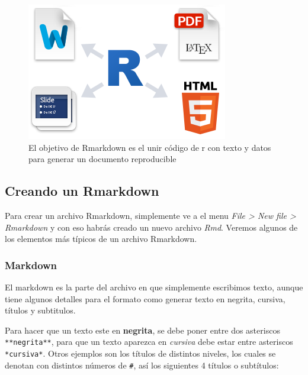 \documentclass[]{book}
\begin{document}
\begin{figure}

{\centering \includegraphics[width=0.8\linewidth]{Rmark} 

}

\caption{El objetivo de Rmarkdown es el unir código de r con texto y datos para generar un documento reproducible}\label{fig:Rmark}
\end{figure}

\hypertarget{creando-un-rmarkdown}{%
\subsection{Creando un Rmarkdown}\label{creando-un-rmarkdown}}

Para crear un archivo Rmarkdown, simplemente ve a el menu \emph{File
\textgreater{} New file \textgreater{} Rmarkdown} y con eso habrás
creado un nuevo archivo \emph{Rmd}. Veremos algunos de los elementos más
típicos de un archivo Rmarkdown.

\hypertarget{markdown}{%
\subsubsection{Markdown}\label{markdown}}

El markdown es la parte del archivo en que simplemente escribimos texto,
aunque tiene algunos detalles para el formato como generar texto en
negrita, cursiva, títulos y subtitulos.

Para hacer que un texto este en \textbf{negrita}, se debe poner entre
dos asteriscos \texttt{**negrita**}, para que un texto aparezca en
\emph{cursiva} debe estar entre asteriscos \texttt{*cursiva*}. Otros
ejemplos son los títulos de distintos niveles, los cuales se denotan con
distintos números de \texttt{\#}, así los siguientes 4 títulos o
subtítulos:
\end{document}
